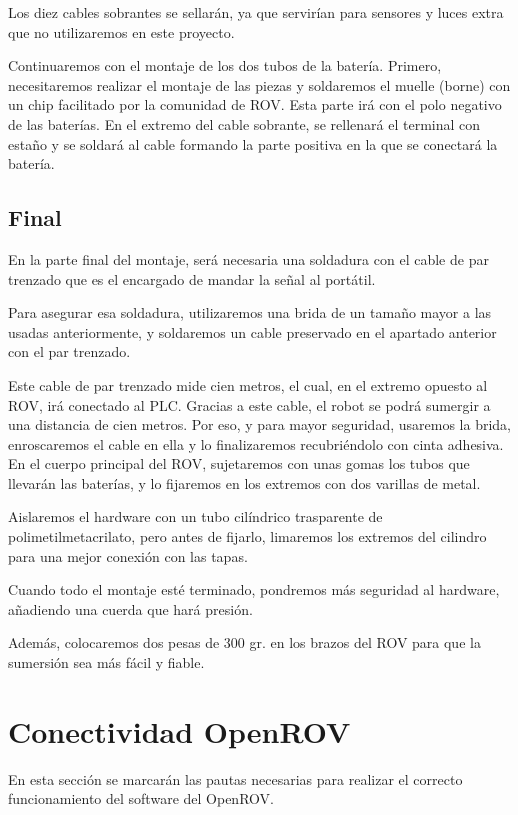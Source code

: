 Los diez cables sobrantes se sellarán, ya que servirían para sensores y luces extra que no  utilizaremos en este proyecto.

Continuaremos con el montaje de los dos tubos de la batería. Primero, necesitaremos realizar el montaje de las piezas y soldaremos el muelle (borne) con un chip facilitado por la comunidad de ROV. Esta parte irá con el polo negativo de las baterías.
En el extremo del cable sobrante, se rellenará el terminal con estaño y se soldará al cable formando la parte positiva en la que se conectará la batería.

\subsection{Final}
\label{subsec:final}

En la parte final del montaje, será necesaria una soldadura con el cable de par trenzado que es el encargado de mandar la señal al portátil.

Para asegurar esa soldadura, utilizaremos una brida de un tamaño mayor a las usadas anteriormente, y soldaremos un cable preservado en el apartado anterior con el par trenzado.

Este cable de par trenzado mide cien metros, el cual, en el extremo opuesto al ROV, irá conectado al PLC. Gracias a este cable, el robot se podrá sumergir a una distancia de cien metros. Por eso, y para mayor seguridad, usaremos la brida, enroscaremos el cable en ella y lo finalizaremos recubriéndolo con cinta adhesiva.
En el cuerpo principal del ROV, sujetaremos con unas gomas los tubos que llevarán las baterías, y lo fijaremos en los extremos con dos varillas de metal.

Aislaremos el hardware con un tubo cilíndrico trasparente de polimetilmetacrilato, pero antes de fijarlo, limaremos los extremos del cilindro para una mejor conexión con las tapas.

Cuando todo el montaje esté terminado, pondremos más seguridad al hardware, añadiendo una cuerda que hará presión.

Además, colocaremos dos pesas de 300 gr. en los brazos del ROV para que la sumersión sea más fácil y fiable.

\section{Conectividad OpenROV}
\label{cap:Conectividad OpenROV}
  
En esta sección se marcarán las pautas necesarias para realizar el correcto funcionamiento del software del OpenROV.  
  

